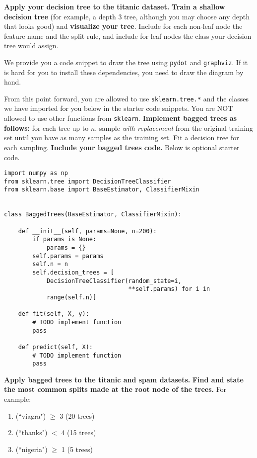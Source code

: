 \documentclass[preview]{standalone}
\begin{document}
\begin{Parts}
\Part \textbf{Apply your decision tree to the titanic dataset.} \textbf{Train a shallow decision tree} (for example, a depth $3$ tree, although you may choose any depth that looks good) and \textbf{visualize your tree}. Include for each non-leaf node the feature name and the split rule, and include for leaf nodes the class your decision tree would assign.

We provide you a code snippet to draw the tree using \texttt{pydot} and \texttt{graphviz}.  If it is hard for you to install these dependencies, you need to draw the diagram by hand.



\Part From this point forward, you are allowed to use \texttt{sklearn.tree.*} and the classes we have imported for you below in the starter code snippets.
You are NOT allowed to use other functions from \texttt{sklearn}.
\textbf{Implement bagged trees as follows:} for each tree up to $n$, sample \textit{with replacement} from the original training set until you have as many samples as the training set.
Fit a decision tree for each sampling.
\textbf{Include your bagged trees code.} Below is optional starter code.

\begin{verbatim}
import numpy as np
from sklearn.tree import DecisionTreeClassifier
from sklearn.base import BaseEstimator, ClassifierMixin


class BaggedTrees(BaseEstimator, ClassifierMixin):

    def __init__(self, params=None, n=200):
        if params is None:
            params = {}	
        self.params = params
        self.n = n
        self.decision_trees = [
            DecisionTreeClassifier(random_state=i, 
                                   **self.params) for i in
            range(self.n)]

    def fit(self, X, y):
        # TODO implement function
        pass

    def predict(self, X):
        # TODO implement function
        pass
\end{verbatim}



\Part \textbf{Apply bagged trees to the titanic and spam datasets.} \textbf{Find and state the most common splits made at the root node of the trees.} For example:
	\begin{enumerate}
		\item (``viagra") $\geq$ 3 (20 trees)
		\item (``thanks") $<$ 4 (15 trees)
		\item (``nigeria") $\geq$ 1 (5 trees)
	\end{enumerate}


\end{Parts}
\end{document}
